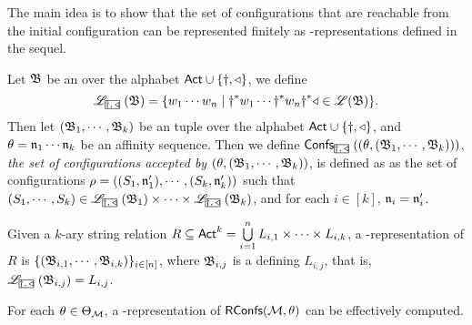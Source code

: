 {The main idea is to show that the set of configurations that are reachable from the initial configuration can be represented finitely as {\WOTrNFA}-representations defined in the sequel. 

Let ${\mathfrak{B} }$ be an {\WOTrNFA} over the alphabet ${\sf Act}\cup\{\dag, \triangleleft\}$, we define 
$$\Lang_{\mhcancel{\dag, \triangleleft}}(\AutB) = \{w_1\cdots w_n\mid \dag^*w_1\cdots\dag^*w_n\dag^*\triangleleft\in\Lang(\AutB)\}.$$
Then let $({\mathfrak{B} }_1,\cdots,{\mathfrak{B} }_k)$ be an {\WOTrNFA} tuple over the alphabet ${\sf Act}\cup\{\dag, \triangleleft\}$, 
and $\theta = \mathfrak{n}_1\cdots\mathfrak{n}_k$ be an affinity sequence. Then we define $\confs_{\mhcancel{\dag,\triangleleft}}((\theta, (\AutB_1,\cdots,\AutB_k)))$, \emph{the set of configurations accepted by $(\theta, ({\mathfrak{B} }_1,\cdots,{\mathfrak{B} }_k))$}, is defined as as the set of configurations $\rho = ((S_1,\mathfrak{n}'_1),\cdots,(S_k,\mathfrak{n}'_k))$  such that $(S_1, \cdots, S_k) \in \Lang_{\mhcancel{\dag,\triangleleft}}(\AutB_1)\times\cdots\times\Lang_{\mhcancel{\dag,\triangleleft}}(\AutB_k)$, and for each $i \in [k]$, $\mathfrak{n}_i=\mathfrak{n}_i'$.

\begin{definition}
    Given a $k$-ary string relation $R\subseteq{\sf Act}^k = \bigcup \limits_{i =1 }^n L_{i,1} \times \cdots \times L_{i, k}$, a {\WOTrNFA}-representation of $R$ is $\{({\mathfrak{B} }_{i,1},\cdots,{\mathfrak{B} }_{i,k})\}_{i\in[n]}$, where ${\mathfrak{B} }_{i,j}$ is a {\WOTrNFA} defining $L_{i,j}$, that is, $\Lang_{\mhcancel{\dag,\triangleleft}}(\AutB_{i,j}) = L_{i,j}$.
\end{definition}
}
    
    \begin{lemma}\label{lem:amass-recog}
        For each $\theta \in \Theta_{\mathcal{M} }$, a {\WOTrNFA}-representation of $\mathsf{RConfs}({\mathcal{M} }, \theta)$ can be effectively computed.
    \end{lemma} 

